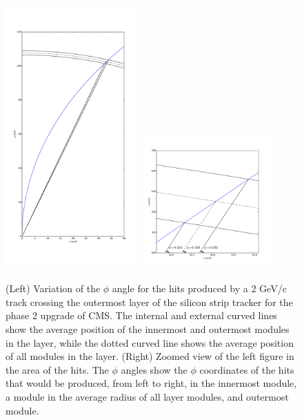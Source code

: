 \documentclass[10pt,a4paper]{report}
\begin{document}
\begin{figure}
\includegraphics[width=0.45\textwidth]{Figures/OutermostRadiusVariation.pdf}
\includegraphics[width=0.45\textwidth]{Figures/OutermostRadiusVariationZoom.pdf}
\caption{(Left) Variation of the $\phi$ angle for the hits produced by a 2 GeV/c track crossing the outermost layer of the silicon strip tracker for the phase 2 upgrade of CMS. The internal and external curved lines show the average position of the innermost and outermost modules in the layer, while the dotted curved line shows the average position of all modules in the layer. (Right) Zoomed view of the left figure in the area of the hits. The $\phi$ angles show the $\phi$ coordinates of the hits that would be produced, from left to right, in the innermost module, a module in the average radius of all layer modules, and outermost module.}
\label{fig:OutermostRadiusVariation}
\end{figure}
\end{document}
